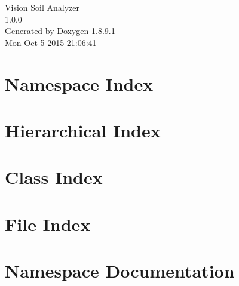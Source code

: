 \documentclass[twoside]{article}
\newcommand{\+}{\discretionary{\mbox{\scriptsize$\hookleftarrow$}}{}{}}
\begin{document}
\hypersetup{pageanchor=false,
             bookmarks=true,
             bookmarksnumbered=true,
             pdfencoding=unicode
            }
\begin{titlepage}
\vspace*{7cm}
\begin{center}%
{\Large Vision Soil Analyzer \\[1ex]\large 1.\+0.\+0 }\\
\vspace*{1cm}
{\large Generated by Doxygen 1.8.9.1}\\
\vspace*{0.5cm}
{\small Mon Oct 5 2015 21:06:41}\\
\end{center}
\end{titlepage}
\tableofcontents
{}
\setcounter{page}{355}
\hypersetup{pageanchor=true}

\section{Namespace Index}

\section{Hierarchical Index}

\section{Class Index}

\section{File Index}

\section{Namespace Documentation}











\end{document}
